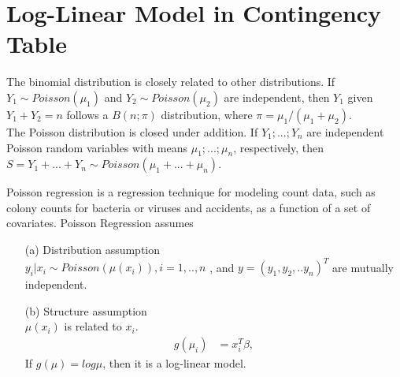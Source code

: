 \section{Log-Linear Model in Contingency Table}

	The binomial distribution is closely related to other distributions. If $Y_1 \sim Poisson(\mu_1)$ and $Y_2 \sim Poisson(\mu_2)$ are independent, then $Y_1$ given $Y_1 + Y_2 = n$ follows a $B(n; \pi)$ distribution, where $\pi = \mu_1/(\mu_1 + \mu_2)$.\\
	The Poisson distribution is closed under addition. If $Y_1; ... ;Y_n$ are independent Poisson random variables with means $\mu_1; ... ; \mu_n$, respectively, then $S = Y_1 + ... + Y_n \sim Poisson(\mu_1 + ... + \mu_n)$.


Poisson regression is a regression technique for modeling count data, such as colony counts for bacteria or viruses and accidents, as a function of a set of covariates.
Poisson Regression assumes
\begin{itemize}
\item[(a)] Distribution assumption\\
$y_i|x_i \sim Poisson(\mu(x_i)), i = 1, .., n$ , and $y = (y_1, y_2,.. y_n)^T$ are mutually independent. 

\item[(b)] Structure assumption\\
$\mu(x_i)$ is related to $x_i$. 
   \begin{align*}
  g( \mu_i) &= x_i^T\beta, 
\end{align*}
If $g(\mu)= log \mu$, then it is a log-linear model.

\end{itemize}

